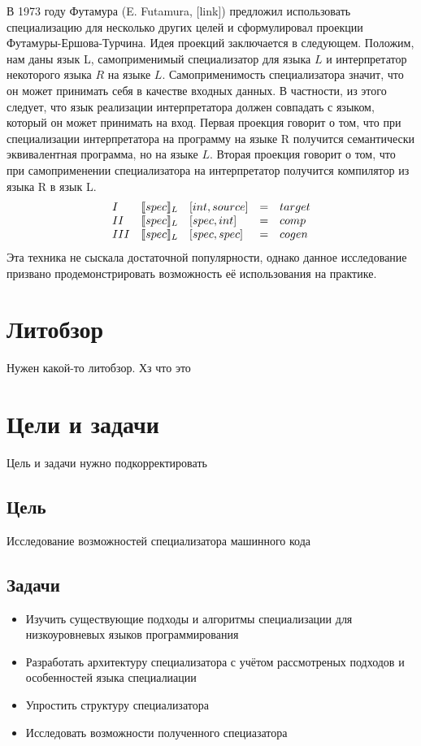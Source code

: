 \documentclass{spbau-diploma}
\begin{document}
В 1973 году Футамура (E. Futamura, [link]) предложил использовать специализацию для несколько других целей и сформулировал проекции Футамуры-Ершова-Турчина. Идея проекций заключается в следующем. Положим, нам даны язык L, самоприменимый специализатор для языка $L$ и интерпретатор некоторого языка $R$ на языке $L$. Самоприменимость специализатора значит, что он может принимать себя в качестве входных данных. В частности, из этого следует, что язык реализации интерпретатора должен совпадать с языком, который он может принимать на вход. Первая проекция говорит о том, что при специализации интерпретатора на программу на языке R получится семантически эквивалентная программа, но на языке $L$. Вторая проекция говорит о том, что при самоприменении специализатора на интерпретатор получится компилятор из языка R в язык L.
    $$
    \begin{array}{l l l c l}
      I & \llbracket spec \rrbracket_L &[int, source] &= &target\\
      II & \llbracket spec \rrbracket_L &[spec, int] &= &comp\\
      III & \llbracket spec \rrbracket_L &[spec, spec] &= &cogen
    \end{array}$$
Эта техника не сыскала достаточной популярности, однако данное исследование призвано продемонстрировать возможность её использования на практике.

\section{Литобзор}

Нужен какой-то литобзор. Хз что это

\section{Цели и задачи}

{\LARGE Цель и задачи нужно подкорректировать}

\subsection{Цель}
Исследование возможностей специализатора машинного кода

\subsection{Задачи}
\begin{itemize}
\item Изучить существующие подходы и алгоритмы специализации для низкоуровневых языков программирования
\item Разработать архитектуру специализатора с учётом рассмотреных подходов и особенностей языка специалиации
\item Упростить структуру специализатора
\item Исследовать возможности полученного специазатора
\end{itemize}
\end{document}
